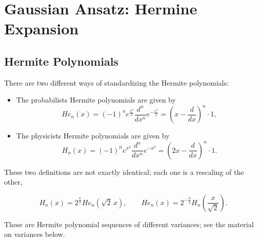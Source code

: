 \section{Gaussian Ansatz: Hermine Expansion}

\subsection{Hermite Polynomials}

There are two different ways of standardizing the Hermite polynomials:

\begin{itemize}
\item The probabilists Hermite polynomials are given by 
\begin{equation}
\mathit{He}_n(x)=(-1)^n e^{\frac{x^2}{2}}\frac{d^n}{dx^n}e^{-\frac{x^2}{2}}=\left (x-\frac{d}{dx} \right )^n \cdot 1,
\end{equation}
\item The physicists Hermite polynomials are given by
\begin{equation}
H_n(x)=(-1)^n e^{x^2}\frac{d^n}{dx^n}e^{-x^2}=\left (2x-\frac{d}{dx} \right )^n \cdot 1. 
\end{equation}
\end{itemize}
These two definitions are not exactly identical; each one is a rescaling of the other,

\begin{equation}
H_n(x)=2^{\tfrac{n}{2}}{\mathit{He}}_n(\sqrt{2} \,x), \qquad \mathit{He}_n(x)=2^{-\tfrac{n}{2}}H_n\left(\frac x{\sqrt{2}} \right).
\end{equation}

These are Hermite polynomial sequences of different variances; see the material on variances below.

